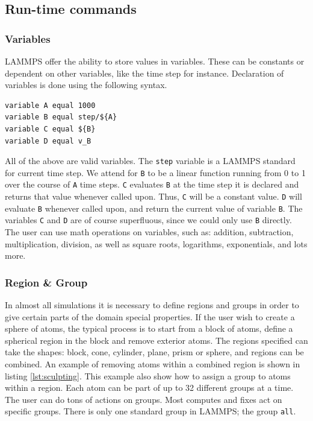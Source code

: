 \documentclass[twoside,english]{uiofysmaster}
\begin{document}
\subsection{Run-time commands} 
\subsubsection{Variables}
LAMMPS offer the ability to store values in variables. These can be constants or dependent on other variables, like the time step for instance. Declaration of variables is done using the following syntax.
\begin{lstlisting}[language=LammpsInput, caption={Declaration of variables.}, label={lammpsVariable}]
variable A equal 1000
variable B equal step/${A}
variable C equal ${B}
variable D equal v_B
\end{lstlisting} 
All of the above are valid variables. 
The \texttt{step} variable is a LAMMPS standard for current time step.
We attend for \texttt{B} to be a linear function running from 0 to 1 over the course of \texttt{A} time steps. 
\texttt{C} evaluates \texttt{B} at the time step it is declared and returns that value whenever called upon. 
Thus, \texttt{C} will be a constant value.
\texttt{D} will evaluate \texttt{B} whenever called upon, and return the current value of variable \texttt{B}. 
The variables \texttt{C} and \texttt{D} are of course superfluous, since we could only use \texttt{B} directly.
The user can use math operations on variables, such as: addition, subtraction, multiplication, division, as well as square roots, logarithms, exponentials, and lots more.


\subsubsection{Region \& Group}
In almost all simulations it is necessary to define regions and groups in order to give certain parts of the domain special properties. 
If the user wish to create a sphere of atoms, the typical process is to start from a block of atoms, define a spherical region in the block and remove exterior atoms. 
The regions specified can take the shapes: block, cone, cylinder, plane, prism or sphere, and regions can be combined.
An example of removing atoms within a combined region is shown in listing \ref{lst:sculpting}. 
This example also show how to assign a group to atoms within a region. 
Each atom can be part of up to 32 different groups at a time. 
The user can do tons of actions on groups. 
Most computes and fixes act on specific groups. 
There is only one standard group in LAMMPS; the group \texttt{all}.
\end{document}
